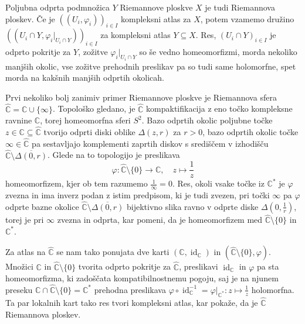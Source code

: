 \documentclass[mat1]{fmfdelo}
\numberwithin{equation}{section}
\newcommand{\C}{\mathbb C}
\newcommand{\CM}{\mathbb C ^*}
\newcommand{\RS}{\widehat{\C}}
\newcommand{\inv}{^{-1}}
\newcommand{\disk}[2]{\Delta(#1, #2)}
\DeclareMathOperator{\id}{id}
\theoremstyle{definition}
\begin{document}
\begin{primer*}
    
    Poljubna odprta podmnožica $Y$ Riemannove ploskve $X$ je tudi Riemannova ploskev. Če je $((U_i, \varphi_i))_{i \in I}$ kompleksni atlas za $X$, potem vzamemo družino $((U_i \cap Y, \varphi_i|_{U_i \cap Y}))_{i \in I}$ za kompleksni atlas $Y\subseteq X$. Res, $(U_i \cap Y)_{i \in I}$ je odprto pokritje za $Y$, zožitve $\varphi_i|_{U_i \cap Y}$ so še vedno homeomorfizmi, morda nekoliko manjših okolic, vse zožitve prehodnih preslikav pa so tudi same holomorfne, spet morda na kakšnih manjših odprtih okolicah. 
\end{primer*}
    
\begin{primer*}
    Prvi nekoliko bolj zanimiv primer Riemannove ploskve je Riemannova sfera $\RS = \C \cup \{\infty\}$. Topološko gledano, je $\RS$ kompaktifikacija z eno točko kompleksne ravnine $\C$, torej homeomorfna sferi $S^2$. Bazo odprtih okolic poljubne točke $z \in \C \subseteq \RS$ tvorijo odprti diski oblike $\disk{z}{r}$ za $r>0$, bazo odprtih okolic točke $\infty \in \RS$ pa sestavljajo komplementi zaprtih diskov s središčem v izhodišču $\RS \setminus \overline{\disk{0}{r}}$. Glede na to topologijo je preslikava
    \[
        \varphi: \RS\setminus\{0\} \to \C, \quad z \mapsto \frac{1}{z}
    \]
    homeomorfizem, kjer ob tem razumemo $\frac{1}{\infty} = 0$. Res, okoli vsake točke iz $\CM$ je $\varphi$ zvezna in ima inverz podan z istim predpisom, ki je tudi zvezen, pri točki $\infty$ pa $\varphi$ odprte bazne okolice $\RS \setminus \overline{\disk{0}{r}}$ bijektivno slika ravno v odprte diske $\disk{0}{\frac{1}{r}}$, torej je pri $\infty$ zvezna in odprta, kar pomeni, da je homeomorfizem med $\RS\setminus\{0\}$ in $\CM$.
    
    Za atlas na $\RS$ se nam tako ponujata dve karti $(\C, \id_\C)$ in $(\RS\setminus\{0\}, \varphi)$. Množici $\C$ in $\RS\setminus\{0\}$ tvorita odprto pokritje za $\RS$, preslikavi $\id_\C$ in $\varphi$ pa sta homeomorfizma, ki zadoščata kompatibilnostnemu pogoju, saj je na njunem preseku $\C \cap \RS\setminus\{0\} = \CM$ prehodna preslikava $\varphi \circ \id_\C\inv = \varphi|_{\CM} : z \mapsto \frac{1}{z}$ holomorfna. Ta par lokalnih kart tako res tvori kompleksni atlas, kar pokaže, da je $\RS$ Riemannova ploskev.
\end{primer*}
\end{document}
